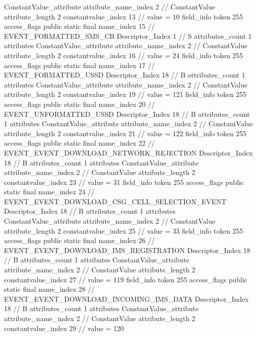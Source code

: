 {{{{{{				ConstantValue_attribute {
					attribute_name_index	2		// ConstantValue
					attribute_length	2
					constantvalue_index	13		// value = 10
				}
				}
			}
			field_info {
				token	255
				access_flags	public static final
				name_index	15		// EVENT_FORMATTED_SMS_CB
				Descriptor_Index	1		// S
				attributes_count	1
				attributes {
				ConstantValue_attribute {
					attribute_name_index	2		// ConstantValue
					attribute_length	2
					constantvalue_index	16		// value = 24
				}
				}
			}
			field_info {
				token	255
				access_flags	public static final
				name_index	17		// EVENT_FORMATTED_USSD
				Descriptor_Index	18		// B
				attributes_count	1
				attributes {
				ConstantValue_attribute {
					attribute_name_index	2		// ConstantValue
					attribute_length	2
					constantvalue_index	19		// value = 121
				}
				}
			}
			field_info {
				token	255
				access_flags	public static final
				name_index	20		// EVENT_UNFORMATTED_USSD
				Descriptor_Index	18		// B
				attributes_count	1
				attributes {
				ConstantValue_attribute {
					attribute_name_index	2		// ConstantValue
					attribute_length	2
					constantvalue_index	21		// value = 122
				}
				}
			}
			field_info {
				token	255
				access_flags	public static final
				name_index	22		// EVENT_EVENT_DOWNLOAD_NETWORK_REJECTION
				Descriptor_Index	18		// B
				attributes_count	1
				attributes {
				ConstantValue_attribute {
					attribute_name_index	2		// ConstantValue
					attribute_length	2
					constantvalue_index	23		// value = 31
				}
				}
			}
			field_info {
				token	255
				access_flags	public static final
				name_index	24		// EVENT_EVENT_DOWNLOAD_CSG_CELL_SELECTION_EVENT
				Descriptor_Index	18		// B
				attributes_count	1
				attributes {
				ConstantValue_attribute {
					attribute_name_index	2		// ConstantValue
					attribute_length	2
					constantvalue_index	25		// value = 33
				}
				}
			}
			field_info {
				token	255
				access_flags	public static final
				name_index	26		// EVENT_EVENT_DOWNLOAD_IMS_REGISTRATION
				Descriptor_Index	18		// B
				attributes_count	1
				attributes {
				ConstantValue_attribute {
					attribute_name_index	2		// ConstantValue
					attribute_length	2
					constantvalue_index	27		// value = 119
				}
				}
			}
			field_info {
				token	255
				access_flags	public static final
				name_index	28		// EVENT_EVENT_DOWNLOAD_INCOMING_IMS_DATA
				Descriptor_Index	18		// B
				attributes_count	1
				attributes {
				ConstantValue_attribute {
					attribute_name_index	2		// ConstantValue
					attribute_length	2
					constantvalue_index	29		// value = 120
}}}}}}}
